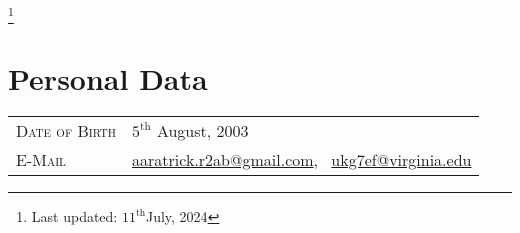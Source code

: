 \documentclass[a4paper, oneside, final]{scrartcl} %
\begin{document}


\begin{center}

  {\fontsize{32}{32}\selectfont\scshape{}} %
  \vspace{0.25 cm}

  {\fontsize{20}{20}\selectfont\scshape{}}\footnote{Last updated: \( {11}^{\text{th}} \)July, 2024}
  \vspace{0.5 cm} %




  \section{Personal Data}

  \begin{tabularx}{0.97\linewidth}{>{\raggedleft\scshape}p{4cm}X}
    Date of Birth & \( {5}^{\text{th}} \) August, 2003                                                                                          \\
    E-Mail        & \href{mailto:aaratrick.r2ab@gmail.com}{aaratrick.r2ab@gmail.com}, \, \href{mailto:ukg7ef@virginia.edu}{ukg7ef@virginia.edu} \\
  \end{tabularx}


\end{center}
\end{document}
